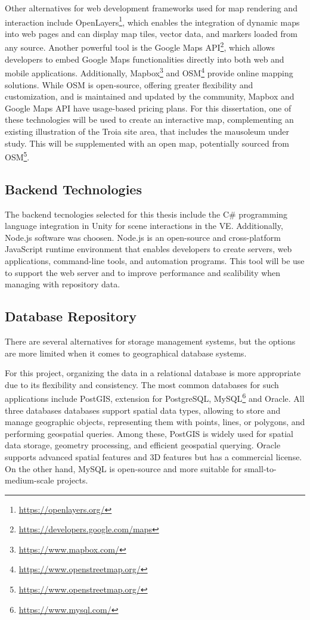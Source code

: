 Other alternatives for web development frameworks used for map rendering and interaction include OpenLayers\footnote{\url{https://openlayers.org/}}, which enables the integration of dynamic maps into web pages and can display map tiles, vector data, and markers loaded from any source.
Another powerful tool is the Google Maps API\footnote{\url{https://developers.google.com/maps}}, which allows developers to embed Google Maps functionalities directly into both web and mobile applications.
Additionally, Mapbox\footnote{\url{https://www.mapbox.com/}} and \gls{OSM}\footnote{\url{https://www.openstreetmap.org/}} provide online mapping solutions. While \gls{OSM} is open-source, offering greater flexibility and customization, and is maintained and updated by the community, Mapbox and Google Maps API have usage-based pricing plans.
For this dissertation, one of these technologies will be used to create an interactive map, complementing an existing illustration of the Troia site area, that includes the mausoleum under study. This will be supplemented with an open map, potentially sourced from \gls{OSM}\footnote{\url{https://www.openstreetmap.org/}}.

\subsection{Backend Technologies}
\label{sec:backend} 

The backend tecnologies selected for this thesis include the C\# programming language integration in Unity for scene interactions in the \gls{VE}.
Additionally, Node.js software was choosen. Node.js is an open-source and cross-platform JavaScript runtime environment that enables developers to create servers, web applications, command-line tools, and automation programs.
This tool will be use to support the web server and to improve performance and scalibility when managing with repository data.


\subsection{Database Repository}
\label{sec:repos}

There are several alternatives for storage management systems, but the options are more limited when it comes to geographical
database systems.

For this project, organizing the data in a relational database is more appropriate due to its flexibility and consistency.
The most common databases for such applications include PostGIS, extension for PostgreSQL, MySQL\footnote{\url{https://www.mysql.com/}} and Oracle.
All three databases databases support spatial data types, allowing to store and manage geographic objects, representing them with points, lines, or polygons, and performing geospatial queries.
Among these, PostGIS is widely used for spatial data storage, geometry processing, and efficient geospatial querying.
Oracle supports advanced spatial features and 3D features but has a commercial license. On the other hand, MySQL is open-source and more suitable for small-to-medium-scale projects.


